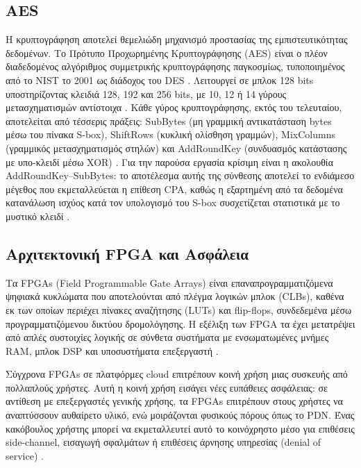 \subsection*{AES}

Η κρυπτογράφηση αποτελεί θεμελιώδη μηχανισμό προστασίας της εμπιστευτικότητας δεδομένων. Το Πρότυπο Προχωρημένης Κρυπτογράφησης (AES) είναι ο πλέον διαδεδομένος αλγόριθμος συμμετρικής κρυπτογράφησης παγκοσμίως, τυποποιημένος από το NIST το 2001 ως διάδοχος του DES \cite{fips2001advanced}. Λειτουργεί σε μπλοκ 128 bits υποστηρίζοντας κλειδιά 128, 192 και 256 bits, με 10, 12 ή 14 γύρους μετασχηματισμών αντίστοιχα \cite{daemen2002design}. Κάθε γύρος κρυπτογράφησης, εκτός του τελευταίου, αποτελείται από τέσσερις πράξεις: SubBytes (μη γραμμική αντικατάσταση bytes μέσω του πίνακα S-box), ShiftRows (κυκλική ολίσθηση γραμμών), MixColumns (γραμμικός μετασχηματισμός στηλών) και AddRoundKey (συνδυασμός κατάστασης με υπο-κλειδί μέσω XOR) \cite{fips2001advanced}. Για την παρούσα εργασία κρίσιμη είναι η ακολουθία AddRoundKey–SubBytes: το αποτέλεσμα αυτής της σύνθεσης αποτελεί το ενδιάμεσο μέγεθος που εκμεταλλεύεται η επίθεση CPA, καθώς η εξαρτημένη από τα δεδομένα κατανάλωση ισχύος κατά τον υπολογισμό του S-box συσχετίζεται στατιστικά με το μυστικό κλειδί \cite{lo2017power,brier2004correlation}.

\subsection*{Αρχιτεκτονική FPGA και Ασφάλεια}

Τα FPGAs (Field Programmable Gate Arrays) είναι επαναπρογραμματιζόμενα ψηφιακά κυκλώματα που αποτελούνται από πλέγμα λογικών μπλοκ (CLBs), καθένα εκ των οποίων περιέχει πίνακες αναζήτησης (LUTs) και flip-flops, συνδεδεμένα μέσω προγραμματιζόμενου δικτύου δρομολόγησης. Η εξέλιξη των FPGA τα έχει μετατρέψει από απλές συστοιχίες λογικής σε σύνθετα συστήματα με ενσωματωμένες μνήμες RAM, μπλοκ DSP και υποσυστήματα επεξεργαστή \cite{boutros2021fpga}. 

Σύγχρονα FPGAs σε πλατφόρμες cloud επιτρέπουν κοινή χρήση μιας συσκευής από πολλαπλούς χρήστες. Αυτή η κοινή χρήση εισάγει νέες ευπάθειες ασφάλειας: σε αντίθεση με επεξεργαστές γενικής χρήσης, τα FPGAs επιτρέπουν στους χρήστες να αναπτύσσουν αυθαίρετο υλικό, ενώ μοιράζονται φυσικούς πόρους όπως το PDN. Ένας κακόβουλος χρήστης μπορεί να εκμεταλλευτεί αυτό το κοινόχρηστο μέσο για επιθέσεις side-channel, εισαγωγή σφαλμάτων ή επιθέσεις άρνησης υπηρεσίας (denial of service) \cite{ahmed2022multi}.

